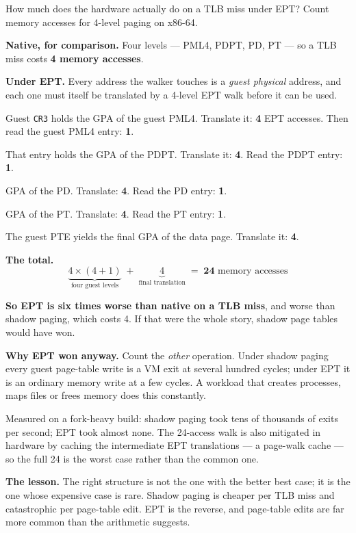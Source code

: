 \begin{worked}
How much does the hardware actually do on a TLB miss under EPT? Count memory
accesses for 4-level paging on x86-64.

\smallskip
\textbf{Native, for comparison.} Four levels --- PML4, PDPT, PD, PT --- so a
TLB miss costs \textbf{4 memory accesses}.

\smallskip
\textbf{Under EPT.} Every address the walker touches is a \emph{guest
physical} address, and each one must itself be translated by a 4-level EPT
walk before it can be used.

\begin{tight}
  \item Guest \texttt{CR3} holds the GPA of the guest PML4. Translate it:
        \textbf{4} EPT accesses. Then read the guest PML4 entry: \textbf{1}.
  \item That entry holds the GPA of the PDPT. Translate it: \textbf{4}. Read
        the PDPT entry: \textbf{1}.
  \item GPA of the PD. Translate: \textbf{4}. Read the PD entry: \textbf{1}.
  \item GPA of the PT. Translate: \textbf{4}. Read the PT entry: \textbf{1}.
  \item The guest PTE yields the final GPA of the data page. Translate it:
        \textbf{4}.
\end{tight}

\smallskip
\textbf{The total.}
\[ \underbrace{4 \times (4 + 1)}_{\text{four guest levels}} \;+\;
   \underbrace{4}_{\text{final translation}} \;=\; \mathbf{24}
   \text{ memory accesses} \]

\smallskip
\textbf{So EPT is six times worse than native on a TLB miss}, and worse than
shadow paging, which costs 4. If that were the whole story, shadow page tables
would have won.

\smallskip
\textbf{Why EPT won anyway.} Count the \emph{other} operation. Under shadow
paging every guest page-table write is a VM exit at several hundred cycles;
under EPT it is an ordinary memory write at a few cycles. A workload that
creates processes, maps files or frees memory does this constantly.

\smallskip
Measured on a fork-heavy build: shadow paging took tens of thousands of exits
per second; EPT took almost none. The 24-access walk is also mitigated in
hardware by caching the intermediate EPT translations --- a page-walk cache ---
so the full 24 is the worst case rather than the common one.

\smallskip
\textbf{The lesson.} The right structure is not the one with the better
best case; it is the one whose expensive case is rare. Shadow paging is
cheaper per TLB miss and catastrophic per page-table edit. EPT is the reverse,
and page-table edits are far more common than the arithmetic suggests.
\end{worked}

